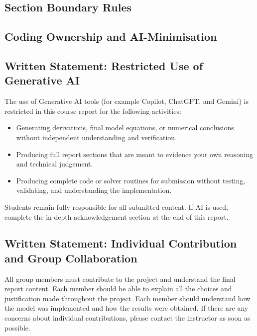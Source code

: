 \documentclass[11pt,a4paper]{article}
\begin{document}
\subsection*{Section Boundary Rules}

\subsection*{Coding Ownership and AI-Minimisation}

\subsection*{Written Statement: Restricted Use of Generative AI}
The use of Generative AI tools (for example Copilot, ChatGPT, and Gemini) is restricted in this course report for the following activities:
\begin{itemize}
    \item Generating derivations, final model equations, or numerical conclusions without independent understanding and verification.
    \item Producing full report sections that are meant to evidence your own reasoning and technical judgement.
    \item Producing complete code or solver routines for submission without testing, validating, and understanding the implementation.
\end{itemize}
Students remain fully responsible for all submitted content. If AI is used, complete the in-depth acknowledgement section at the end of this report.

\subsection*{Written Statement: Individual Contribution and Group Collaboration}
All group members must contribute to the project and understand the final report content. Each member should be able to explain all the choices and justification made throughout the project. Each member should understand how the model was implemented and how the results were obtained. If there are any concerns about individual contributions, please contact the instructor as soon as possible. 
\end{document}
